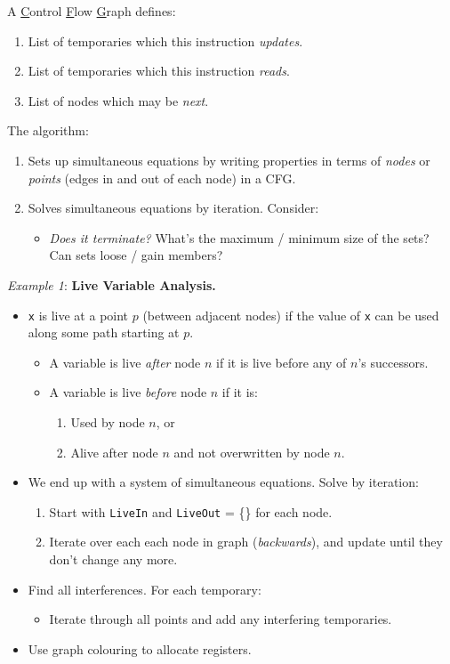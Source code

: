 \documentclass[twocolumn,english]{article}
\begin{document}
A \uline{C}ontrol \uline{F}low \uline{G}raph defines:
\begin{enumerate}
\item List of temporaries which this instruction \emph{updates}.
\item List of temporaries which this instruction \emph{reads}.
\item List of nodes which may be \emph{next}.
\end{enumerate}
The algorithm:
\begin{enumerate}
\item Sets up simultaneous equations by writing properties in terms of \emph{nodes}
or \emph{points} (edges in and out of each node) in a CFG.
\item Solves simultaneous equations by iteration. Consider:
\begin{itemize}
\item \emph{Does it terminate?} What's the maximum / minimum size of the
sets? Can sets loose / gain members?
\end{itemize}
\end{enumerate}
\emph{Example 1}: \textbf{Live Variable Analysis.}
\begin{itemize}
\item \texttt{x} is live at a point $p$ (between adjacent nodes) if the
value of \texttt{x} can be used along some path starting at $p$.
\begin{itemize}
\item A variable is live \emph{after} node $n$ if it is live before any
of $n$'s successors.
\item A variable is live \emph{before} node $n$ if it is:
\begin{enumerate}
\item Used by node $n$, or
\item Alive after node $n$ and not overwritten by node $n$.
\end{enumerate}
\end{itemize}
\item We end up with a system of simultaneous equations. Solve by iteration:
\begin{enumerate}
\item Start with \texttt{LiveIn} and \texttt{LiveOut} = \{\} for each node.
\item Iterate over each each node in graph (\emph{backwards}), and update
until they don't change any more.
\end{enumerate}
\item Find all interferences. For each temporary:
\begin{itemize}
\item Iterate through all points and add any interfering temporaries.
\end{itemize}
\item Use graph colouring to allocate registers.
\end{itemize}
\end{document}
